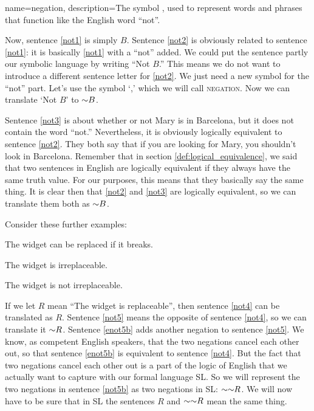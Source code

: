 {
name=negation,
description={The symbol \enot, used to represent words and phrases that function like the English word ``not''.}
}

Now, sentence \ref{not1} is simply $B$. Sentence \ref{not2} is obviously related to sentence \ref{not1}: it is basically \ref{not1} with a ``not'' added. We could put the sentence partly our symbolic language by writing ``Not $B$.'' This means we do not want to introduce a different sentence letter for \ref{not2}. We just need a new symbol for the ``not'' part. Let's use the symbol `\enot,' which we will call \textsc{\gls{negation}}. \label{def:negation} Now we can translate `Not $B$' to $\mathord{\sim} B$. 

Sentence \ref{not3} is about whether or not Mary is in Barcelona, but it does not contain the word ``not.'' Nevertheless, it is obviously logically equivalent to sentence \ref{not2}. They both say that if you are looking for Mary, you shouldn't look in Barcelona. Remember that in section \ref{def:logical_equivalence}, we said that two sentences in English are logically equivalent if they always have the same truth value. For our purposes, this means that they basically say the same thing. It is clear then that \ref{not2} and \ref{not3} are logically equivalent, so we can translate them both as $\mathord{\sim} B$.



Consider these further examples:
\begin{earg}
\item[\ex{not4}] The widget can be replaced if it breaks.
\item[\ex{not5}] The widget is irreplaceable.
\item[\ex{not5b}] The widget is not irreplaceable.
\end{earg}


If we let $R$ mean ``The widget is replaceable'', then sentence \ref{not4} can be translated as $R$. Sentence \ref{not5} means the opposite of sentence \ref{not4}, so we can translate it $\mathord{\sim} R$. Sentence \ref{enot5b} adds another negation to sentence \ref{not5}. We know, as competent English speakers, that the two negations cancel each other out, so that sentence \ref{enot5b} is equivalent to sentence \ref{not4}. But the fact that two negations cancel each other out is a part of the logic of English that we actually want to capture with our formal language SL. So we will represent the two negations in sentence \ref{not5b} as two negations in SL: $\mathord{\sim} \mathord{\sim} R$. We will now have to be sure that in SL the sentences $R$ and $\mathord{\sim} \mathord{\sim} R$ mean the same thing. 

